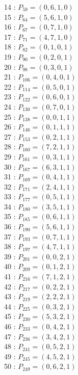 \documentclass{article}
\begin{document}
{\begin{multicols}{3}
14 : $P_{59}=( 0, 6, 1, 0 )$\\
15 : $P_{64}=( 5, 6, 1, 0 )$\\
16 : $P_{67}=( 0, 7, 1, 0 )$\\
17 : $P_{71}=( 4, 7, 1, 0 )$\\
18 : $P_{82}=( 0, 1, 0, 1 )$\\
19 : $P_{90}=( 0, 2, 0, 1 )$\\
20 : $P_{98}=( 0, 3, 0, 1 )$\\
21 : $P_{106}=( 0, 4, 0, 1 )$\\
22 : $P_{114}=( 0, 5, 0, 1 )$\\
23 : $P_{122}=( 0, 6, 0, 1 )$\\
24 : $P_{130}=( 0, 7, 0, 1 )$\\
25 : $P_{138}=( 0, 0, 1, 1 )$\\
26 : $P_{146}=( 0, 1, 1, 1 )$\\
27 : $P_{153}=( 0, 2, 1, 1 )$\\
28 : $P_{160}=( 7, 2, 1, 1 )$\\
29 : $P_{161}=( 0, 3, 1, 1 )$\\
30 : $P_{167}=( 6, 3, 1, 1 )$\\
31 : $P_{169}=( 0, 4, 1, 1 )$\\
32 : $P_{171}=( 2, 4, 1, 1 )$\\
33 : $P_{177}=( 0, 5, 1, 1 )$\\
34 : $P_{180}=( 3, 5, 1, 1 )$\\
35 : $P_{185}=( 0, 6, 1, 1 )$\\
36 : $P_{190}=( 5, 6, 1, 1 )$\\
37 : $P_{193}=( 0, 7, 1, 1 )$\\
38 : $P_{197}=( 4, 7, 1, 1 )$\\
39 : $P_{201}=( 0, 0, 2, 1 )$\\
40 : $P_{209}=( 0, 1, 2, 1 )$\\
41 : $P_{216}=( 7, 1, 2, 1 )$\\
42 : $P_{217}=( 0, 2, 2, 1 )$\\
43 : $P_{219}=( 2, 2, 2, 1 )$\\
44 : $P_{225}=( 0, 3, 2, 1 )$\\
45 : $P_{230}=( 5, 3, 2, 1 )$\\
46 : $P_{233}=( 0, 4, 2, 1 )$\\
47 : $P_{236}=( 3, 4, 2, 1 )$\\
48 : $P_{241}=( 0, 5, 2, 1 )$\\
49 : $P_{245}=( 4, 5, 2, 1 )$\\
50 : $P_{249}=( 0, 6, 2, 1 )$\\

\end{multicols}}
\end{document}
